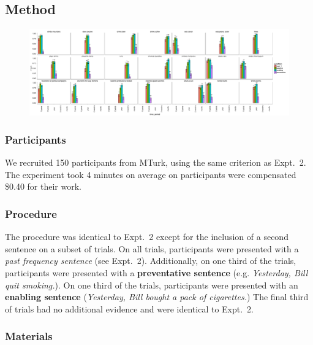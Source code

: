 \documentclass[10pt,letterpaper]{article}
\begin{document}
\subsection{Method}
\begin{figure}[t]
\centering
  \includegraphics[width=\textwidth]{truth-judgments-3items-withtj2.pdf}
  \caption{}
  \label{fig:tj3}
\end{figure}

\subsubsection{Participants} 

We recruited 150 participants from MTurk, using the same criterion as Expt.~2.
The experiment took 4 minutes on average on participants were compensated \$0.40 for their work.

\subsubsection{Procedure}

The procedure was identical to Expt.~2 except for the inclusion of a second sentence on a subset of trials. 
On all trials, participants were presented with a \emph{past frequency sentence} (see Expt.~2).
Additionally, on one third of the trials, participants were presented with a \textbf{preventative sentence} (e.g. \emph{Yesterday, Bill quit smoking.}). %
On one third of the trials, participants were presented with an \textbf{enabling sentence} (\emph{Yesterday, Bill bought a pack of cigarettes.}) %
The final third of trials had no additional evidence and were identical to Expt.~2. 

\subsubsection{Materials}
\end{document}
